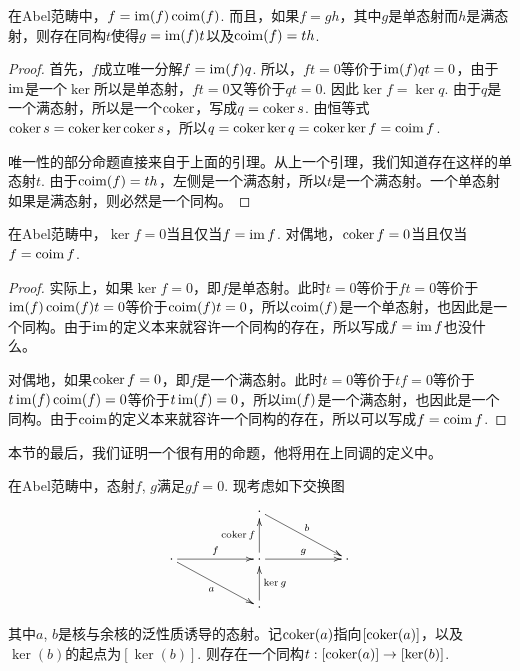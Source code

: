 \begin{pro}\label{uni}
在Abel范畴中，$f=\operatorname{im}(f)\operatorname{coim}(f)$. 而且，如果$f=gh$，其中$g$是单态射而$h$是满态射，则存在同构$t$使得$g=\operatorname{im}(f)t$以及$\operatorname{coim}(f)=th$.
\end{pro}

\begin{proof}
首先，$f$成立唯一分解$f=\operatorname{im}(f)q$. 所以，$ft=0$等价于$\operatorname{im}(f)qt=0$，由于$\operatorname{im}$是一个$\ker$所以是单态射，$ft=0$又等价于$qt=0$. 因此$\ker f= \ker q$. 由于$q$是一个满态射，所以是一个$\operatorname{coker}$，写成$q=\operatorname{coker} s$. 由恒等式$\operatorname{coker} s = \operatorname{coker} \ker \operatorname{coker} s$，所以$q=\operatorname{coker} \ker q=\operatorname{coker} \ker f=\operatorname{coim} f$. 

唯一性的部分命题直接来自于上面的引理。从上一个引理，我们知道存在这样的单态射$t$. 由于$\operatorname{coim}(f)=th$，左侧是一个满态射，所以$t$是一个满态射。一个单态射如果是满态射，则必然是一个同构。
\end{proof}

\begin{pro}\label{pro:1.5.21}
在Abel范畴中，$\ker f=0$当且仅当$f=\operatorname{im} f$. 对偶地，$\operatorname{coker} f=0$当且仅当$f=\operatorname{coim} f$. 
\end{pro}

\begin{proof}
实际上，如果$\ker f=0$，即$f$是单态射。此时$t=0$等价于$ft=0$等价于$\operatorname{im} (f) \operatorname{coim}(f)t=0$等价于$\operatorname{coim}(f)t=0$，所以$\operatorname{coim}(f)$是一个单态射，也因此是一个同构。由于$\operatorname{im}$的定义本来就容许一个同构的存在，所以写成$f=\operatorname{im} f$也没什么。

对偶地，如果$\operatorname{coker} f=0$，即$f$是一个满态射。此时$t=0$等价于$tf=0$等价于$t\operatorname{im} (f) \operatorname{coim}(f)=0$等价于$t\operatorname{im}(f)=0$，所以$\operatorname{im}(f)$是一个满态射，也因此是一个同构。由于$\operatorname{coim}$的定义本来就容许一个同构的存在，所以可以写成$f=\operatorname{coim} f$.
\end{proof}

本节的最后，我们证明一个很有用的命题，他将用在上同调的定义中。

\begin{pro}
在Abel范畴中，态射$f$, $g$满足$gf=0$. 现考虑如下交换图
\[
\begin{xy}
	\xymatrix{
	&&\cdot \ar[rrd]^b&&\\
	\cdot \ar[rr]^f \ar[rrd]_a&&\cdot \ar[rr]^g\ar[u]^{\coker f}&&\cdot\\
	&&\cdot \ar[u]_{\ker g}&&
	}
\end{xy}
\]
其中$a$, $b$是核与余核的泛性质诱导的态射。记$\operatorname{coker}(a)$指向$[\operatorname{coker}(a)]$，以及$\ker(b)$的起点为$[\ker(b)]$. 则存在一个同构$t:[\operatorname{coker}(a)]\to [\ker(b)]$.
\end{pro}

